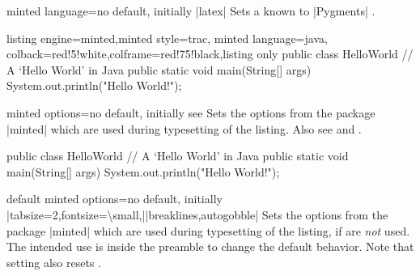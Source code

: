 \begin{docTcbKey}{minted language}{=}{no default, initially |latex|}
Sets a  known to |Pygments| \cite{pygments:web}.
\begin{dispExample}
\begin{tcblisting}{listing engine=minted,minted style=trac,
  minted language=java,
  colback=red!5!white,colframe=red!75!black,listing only}
    public class HelloWorld {
      // A `Hello World' in Java
      public static void main(String[] args) {
        System.out.println("Hello World!");
      }
    }
\end{tcblisting}
\end{dispExample}
\end{docTcbKey}


\begin{docTcbKey}[][doc updated={2021-12-15}]{minted options}{=}{no default, initially
    \linebreak see }
  Sets the options from the package |minted| \cite{poore:minted}
  which are used during typesetting of the listing.
  Also see  and .
\begin{dispExample}

\begin{myjava}
  public class HelloWorld {
    // A `Hello World' in Java
    public static void main(String[] args) {
      System.out.println("Hello World!");
    }
  }
\end{myjava}
\end{dispExample}
\end{docTcbKey}


\clearpage
\begin{docTcbKey}[][doc new={2021-12-15}]{default minted options}{=}{no default, initially
    |tabsize=2,fontsize=\textbackslash small,|\linebreak|breaklines,autogobble|}
  Sets the options from the package |minted| \cite{poore:minted}
  which are used during typesetting of the listing, if
   are \emph{not} used. The intended use is
  inside the preamble to change the default behavior.
  Note that setting  also resets .
\begin{dispListing}
\end{dispListing}
\end{docTcbKey}



